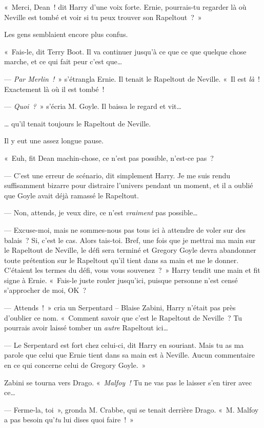 «~Merci, Dean~! dit Harry d'une voix forte.
Ernie, pourrais-tu regarder là où Neville est tombé et voir si tu peux trouver son Rapeltout~?~»

Les gens semblaient encore plus confus.

«~Fais-le, dit Terry Boot.
Il va continuer jusqu'à ce que ce que quelque chose marche, et ce qui fait peur c'est que…

--- \emph{Par Merlin~!}~» s'étrangla Ernie.
Il tenait le Rapeltout de Neville.
«~Il est \emph{là}~!
Exactement là où il est tombé~!

--- \emph{Quoi~?}~» s'écria M. Goyle.
Il baissa le regard et vit…

… qu'il tenait toujours le Rapeltout de Neville.

Il y eut une assez longue pause.

«~Euh, fit Dean machin-chose, ce n'est pas possible, n'est-ce pas~?

--- C'est une erreur de scénario, dit simplement Harry.
Je me suis rendu suffisamment bizarre pour distraire l'univers pendant un moment, et il a oublié que Goyle avait déjà ramassé le Rapeltout.

--- Non, attends, je veux dire, ce n'est \emph{vraiment} pas possible…

--- Excuse-moi, mais ne sommes-nous pas tous ici à attendre de voler sur des balais~?
Si, c'est le cas.
Alors tais-toi.
Bref, une fois que je mettrai ma main sur le Rapeltout de Neville, le défi sera terminé et Gregory Goyle devra abandonner toute prétention sur le Rapeltout qu'il tient dans sa main et me le donner.
C'étaient les termes du défi, vous vous souvenez~?~»
Harry tendit une main et fit signe à Ernie.
«~Fais-le juste rouler jusqu'ici, puisque personne n'est censé s'approcher de moi, OK~?

--- Attends~!~»
cria un Serpentard -- Blaise Zabini, Harry n'était pas près d'oublier ce nom.
«~Comment savoir que c'est le Rapeltout de Neville~?
Tu pourrais avoir laissé tomber un \emph{autre} Rapeltout ici…

--- Le Serpentard est fort chez celui-ci, dit Harry en souriant.
Mais tu as ma parole que celui que Ernie tient dans sa main est à Neville.
Aucun commentaire en ce qui concerne celui de Gregory Goyle.~»

Zabini se tourna vers Drago.
«~\emph{Malfoy~!} Tu ne vas pas le laisser s'en tirer avec ce…

--- Ferme-la, toi~», gronda M. Crabbe, qui se tenait derrière Drago.
«~M. Malfoy a pas besoin qu'\emph{tu} lui dises quoi faire~!~»

